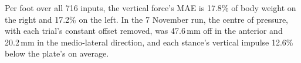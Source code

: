 \documentclass[11pt]{article}
\begin{document}
Per foot over all 716 inputs, the vertical force's MAE is 17.8\% of body weight on the right and 17.2\% on the left.
In the 7 November run, the centre of pressure, with each trial's constant offset removed, was 47.6\,mm off in the
anterior and 20.2\,mm in the medio-lateral direction, and each stance's vertical impulse 12.6\% below the plate's on
average.
\end{document}
